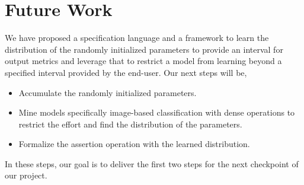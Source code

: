 \section{Future Work}
\label{sec:future}
We have proposed a specification language and a framework to learn the distribution of the randomly initialized parameters to provide an interval for output metrics and leverage that to restrict a model from learning beyond a specified interval provided by the end-user. Our next steps will be,
\begin{itemize}
	\item Accumulate the randomly initialized parameters.
	\item Mine models specifically image-based classification with dense operations to restrict the effort and find the distribution of the parameters.
	\item Formalize the assertion operation with the learned distribution.
\end{itemize}
In these steps, our goal is to deliver the first two steps for the next checkpoint of our project.